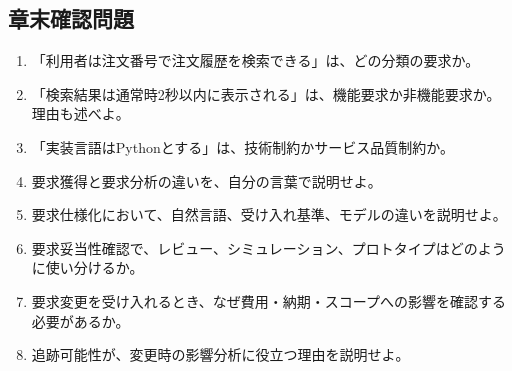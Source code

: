 \subsection{章末確認問題}

\begin{enumerate}
\item 「利用者は注文番号で注文履歴を検索できる」は、どの分類の要求か。
\item 「検索結果は通常時2秒以内に表示される」は、機能要求か非機能要求か。理由も述べよ。
\item 「実装言語はPythonとする」は、技術制約かサービス品質制約か。
\item 要求獲得と要求分析の違いを、自分の言葉で説明せよ。
\item 要求仕様化において、自然言語、受け入れ基準、モデルの違いを説明せよ。
\item 要求妥当性確認で、レビュー、シミュレーション、プロトタイプはどのように使い分けるか。
\item 要求変更を受け入れるとき、なぜ費用・納期・スコープへの影響を確認する必要があるか。
\item 追跡可能性が、変更時の影響分析に役立つ理由を説明せよ。
\end{enumerate}

